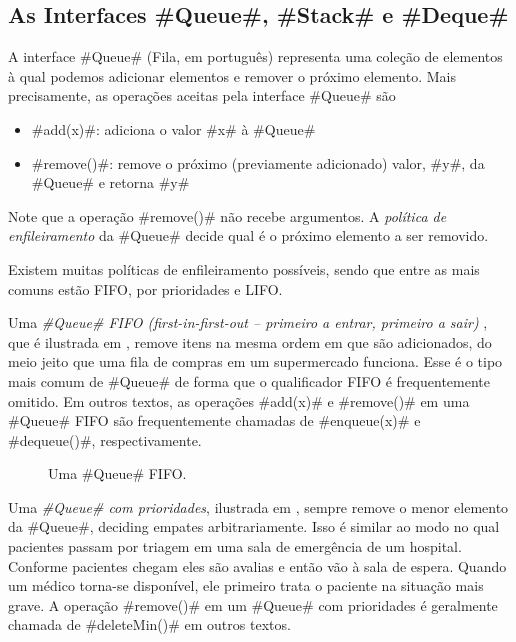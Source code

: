 \subsection{As Interfaces #Queue#, #Stack# e #Deque#}

A interface #Queue# (Fila, em português) representa uma coleção de elementos à qual podemos
adicionar elementos e remover o próximo elemento. Mais precisamente, as operações
aceitas pela interface #Queue# são
\begin{itemize}
  \item #add(x)#: adiciona o valor #x# à #Queue#
  \item #remove()#: remove o próximo (previamente adicionado) valor, #y#, da #Queue# e retorna #y#
\end{itemize}
Note que 
a operação #remove()# não recebe argumentos.
A \emph{política de enfileiramento} da #Queue# decide qual é o próximo elemento a ser removido.

Existem muitas políticas de enfileiramento possíveis, sendo que entre as mais comuns estão FIFO, por prioridades e LIFO.

Uma \emph{#Queue# FIFO (first-in-first-out -- primeiro a entrar, primeiro a sair) },
%
%
que é ilustrada em 
, remove itens na mesma ordem em que são adicionados, do meio jeito que uma fila de compras em um supermercado funciona.
Esse é o tipo mais comum de #Queue# de forma que o qualificador FIFO é frequentemente omitido.
Em outros textos, as operações #add(x)# e #remove()# em uma #Queue# FIFO são frequentemente chamadas de  #enqueue(x)# e #dequeue()#, respectivamente.

\begin{figure}
  \caption[Uma queue (fila) FIFO]{Uma #Queue# FIFO.}
\end{figure}

Uma \emph{#Queue# com prioridades},
%
%
%
%
ilustrada em , sempre 
remove o menor elemento da #Queue#, deciding empates arbitrariamente.
Isso é similar ao modo no qual pacientes passam por triagem em uma sala de emergência de um hospital. Conforme pacientes chegam eles são avalias e então
vão à sala de espera. Quando um médico torna-se disponível, ele primeiro trata o paciente na situação mais grave. A operação #remove()# em um #Queue# com prioridades é geralmente chamada de #deleteMin()# em outros textos.

